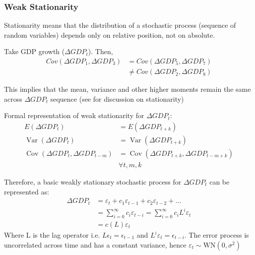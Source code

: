 \begin{frame}[allowframebreaks]
    \frametitle{Weak Stationarity}
    \begin{center}
        Stationarity means that the distribution of a stochastic process (sequence of random variables) depends only on relative position, not on absolute.
    \end{center}
    \begin{center}
        Take GDP growth (${\Delta GDP}_t$). Then,
        \begin{align*}
            Cov({\Delta GDP}_1, {\Delta GDP}_3) & = Cov({\Delta GDP}_5, {\Delta GDP}_7) \\ & \ne Cov({\Delta GDP}_2, {\Delta GDP}_8)
        \end{align*}
    \end{center}
    \begin{center}
        This implies that the mean, variance and other higher moments remain the same across ${\Delta GDP}_t$ sequence (see \cite[98]{hayashi_2011_econometrics} for discussion on stationarity)
    \end{center}
    \begin{center}
        Formal representation of weak stationarity \parencite[174]{ghysels_2018_applied} for ${\Delta GDP}_t$:
        \begin{align*}
            E\left({\Delta GDP}_t\right)                                      & =E\left({\Delta GDP}_{t+k}\right)                                        \\
            \operatorname{Var}\left({\Delta GDP}_t\right)                     & =\operatorname{Var}\left({\Delta GDP}_{t+k}\right)                       \\
            \operatorname{Cov}\left({\Delta GDP}_t, {\Delta GDP}_{t-m}\right) & =\operatorname{Cov}\left({\Delta GDP}_{t+k}, {\Delta GDP}_{t-m+k}\right) \\ &\forall t, m, k
        \end{align*}

    \end{center}
    \pagebreak
    \begin{center}
        Therefore, a basic weakly stationary stochastic process for ${\Delta GDP}_t$ can be represented as:
        \begin{align*}
            {\Delta GDP}_t & =\varepsilon_t+c_1 \varepsilon_{t-1}+c_2 \varepsilon_{t-2}+\ldots                    \\
                           & =\sum_{i=0}^{\infty} c_i \varepsilon_{t-i}=\sum_{i=0}^{\infty} c_i L^i \varepsilon_t \\
                           & =c(L) \varepsilon_t
        \end{align*}
        Where L is the lag operator i.e. $L\epsilon_t = \epsilon_{t-1}$ and $L^i \varepsilon_t=\epsilon_{t-i}$. The error process is uncorrelated across time and has a constant variance, hence $\varepsilon_{t}\sim\mathrm{WN}(0,\sigma^{2})$ \parencite[175]{ghysels_2018_applied}
    \end{center}
\end{frame}